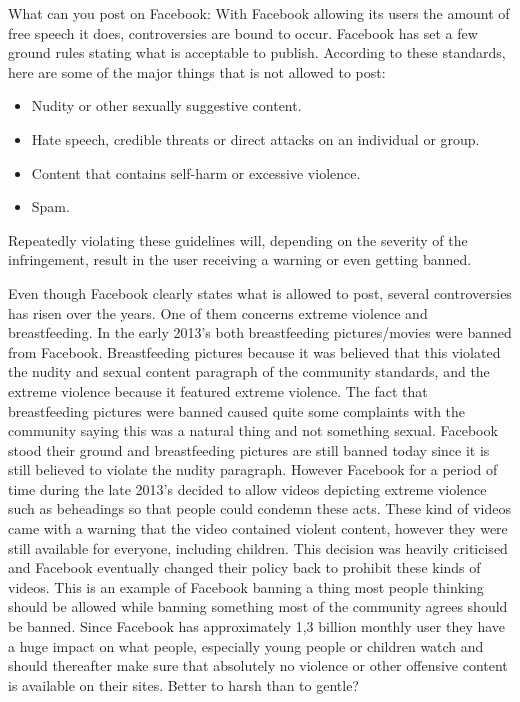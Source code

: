 \documentclass[conference]{IEEEtran}
\begin{document}
What can you post on Facebook:
With Facebook allowing its users the amount of free speech it does, controversies are bound to occur. Facebook has set a few ground rules stating what is acceptable to publish. According to these standards, here are some of the major things that is not allowed to post\cite{FCS}: 

\begin{itemize}
  \item Nudity or other sexually suggestive content.
  \item Hate speech, credible threats or direct attacks on an individual or group.
  \item Content that contains self-harm or excessive violence.
  \item Spam. 
\end{itemize}


Repeatedly violating these guidelines will, depending on the severity of the infringement, result in the user receiving a warning or even getting banned. 

Even though Facebook clearly states what is allowed to post, several controversies has risen over the years. One of them concerns extreme violence and breastfeeding.
In the early 2013’s both breastfeeding pictures/movies were banned from Facebook. Breastfeeding pictures because it was believed that this violated the nudity and sexual content paragraph of the community standards, and the extreme violence because it featured extreme violence. The fact that breastfeeding pictures were banned caused quite some complaints with the community saying this was a natural thing and not something sexual. Facebook stood their ground and breastfeeding pictures are still banned today since it is still believed to violate the nudity paragraph. However Facebook for a period of time during the late 2013’s decided to allow videos depicting extreme violence such as beheadings so that people could condemn these acts. These kind of videos came with a warning that the video contained violent content, however they were still available for everyone, including children. This decision was heavily criticised and Facebook eventually changed their policy back to prohibit these kinds of videos. 
This is an example of Facebook banning a thing most people thinking should be allowed while banning something most of the community agrees should be banned. Since Facebook has approximately 1,3 billion monthly user they have a huge impact on what people, especially young people or children watch and should thereafter make sure that absolutely no violence or other offensive content is available on their sites. Better to harsh than to gentle?\cite{WikiCriticism2014}
\end{document}
